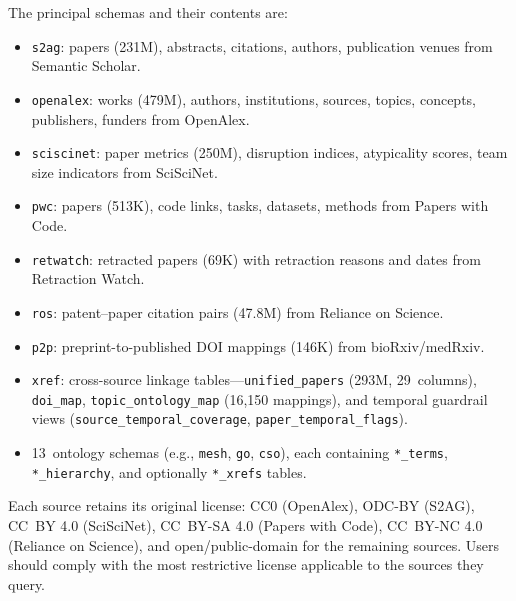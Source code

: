 \begin{minipage}{\textwidth}
The principal schemas and their contents are:

\begin{itemize}[nosep]
  \item \texttt{s2ag}: papers (231M), abstracts, citations, authors, publication
    venues from Semantic Scholar.
  \item \texttt{openalex}: works (479M), authors, institutions, sources, topics,
    concepts, publishers, funders from OpenAlex.
  \item \texttt{sciscinet}: paper metrics (250M), disruption indices, atypicality
    scores, team size indicators from SciSciNet.
  \item \texttt{pwc}: papers (513K), code links, tasks, datasets, methods from
    Papers with Code.
  \item \texttt{retwatch}: retracted papers (69K) with retraction reasons and
    dates from Retraction Watch.
  \item \texttt{ros}: patent--paper citation pairs (47.8M) from Reliance on Science.
  \item \texttt{p2p}: preprint-to-published DOI mappings (146K) from bioRxiv/medRxiv.
  \item \texttt{xref}: cross-source linkage tables---\texttt{unified\_papers}
    (293M, 29~columns), \texttt{doi\_map}, \texttt{topic\_ontology\_map}
    (16,150 mappings), and temporal guardrail views
    (\texttt{source\_temporal\_coverage}, \texttt{paper\_temporal\_flags}).
  \item 13~ontology schemas (e.g., \texttt{mesh}, \texttt{go}, \texttt{cso}),
    each containing \texttt{*\_terms}, \texttt{*\_hierarchy}, and optionally
    \texttt{*\_xrefs} tables.
\end{itemize}

\smallskip
Each source retains its original license: CC0 (OpenAlex), ODC-BY (S2AG),
CC~BY 4.0 (SciSciNet), CC~BY-SA 4.0 (Papers with Code), CC~BY-NC 4.0
(Reliance on Science), and open/public-domain for the remaining sources.
Users should comply with the most restrictive license applicable to the
sources they query.
\end{minipage}

